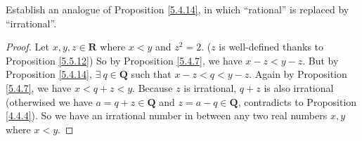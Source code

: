 \begin{exercise}\label{ex 5.5.5}
Establish an analogue of Proposition \ref{5.4.14}, in which ``rational'' is replaced by ``irrational''.
\end{exercise}

\begin{proof}
Let \(x, y, z \in \mathbf{R}\) where \(x < y\) and \(z^2 = 2\).
(\(z\) is well-defined thanks to Proposition \ref{5.5.12})
So by Proposition \ref{5.4.7}, we have \(x - z < y - z\).
But by Proposition \ref{5.4.14}, \(\exists\ q \in \mathbf{Q}\) such that \(x - z < q < y - z\).
Again by Proposition \ref{5.4.7}, we have \(x < q + z < y\).
Because \(z\) is irrational, \(q + z\) is also irrational
(otherwised we have \(a = q + z \in \mathbf{Q}\) and \(z = a - q \in \mathbf{Q}\), contradicts to Proposition \ref{4.4.4}).
So we have an irrational number in between any two real numbers \(x, y\) where \(x < y\).
\end{proof}